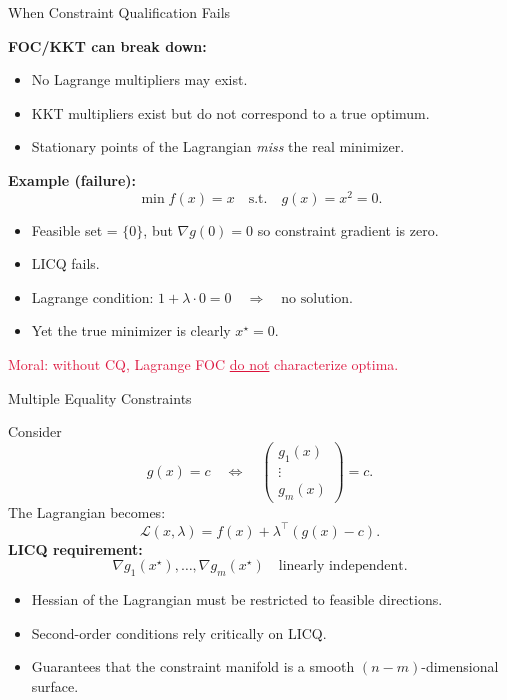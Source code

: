 \documentclass[aspectratio=169]{beamer}
\begin{document}
\begin{frame}{When Constraint Qualification Fails}

\textbf{FOC/KKT can break down:}
\begin{itemize}
  \item No Lagrange multipliers may exist.
  \item KKT multipliers exist but do not correspond to a true optimum.
  \item Stationary points of the Lagrangian \emph{miss} the real minimizer.
\end{itemize}
  \pause
\textbf{Example (failure):}
\[
\min f(x)=x 
\quad\text{s.t.}\quad g(x)=x^2=0.
\]
  \pause
\begin{itemize}
  \item Feasible set = \(\{0\}\), but \(\nabla g(0)=0\) so constraint gradient is zero.
  \item LICQ fails.
  \item Lagrange condition: $
    1 + \lambda\cdot 0 = 0 \quad\Rightarrow\quad \text{no solution}.
    $
  \item Yet the true minimizer is clearly \(x^\star=0\).
\end{itemize}

\textcolor{Crimson}{Moral: without CQ, Lagrange FOC \underline{do not} characterize optima.}

\end{frame}

\begin{frame}{Multiple Equality Constraints}

Consider
\[
g(x)=c \quad\Leftrightarrow\quad
\begin{pmatrix}
g_1(x) \\
\vdots \\
g_m(x)
\end{pmatrix}
=
c.
\]
  \pause
The Lagrangian becomes:
\[
\mathcal{L}(x,\lambda)
=f(x)+\lambda^\top(g(x)-c).
\]
  \pause
\textbf{LICQ requirement:}
\[
\nabla g_1(x^\star),\ldots,\nabla g_m(x^\star)
\quad \text{linearly independent.}
\]

\begin{itemize}
  \item Hessian of the Lagrangian must be restricted to feasible directions.
  \item Second-order conditions rely critically on LICQ.
  \item Guarantees that the constraint manifold is a smooth \((n-m)\)-dimensional surface.
\end{itemize}

\end{frame}
\end{document}
